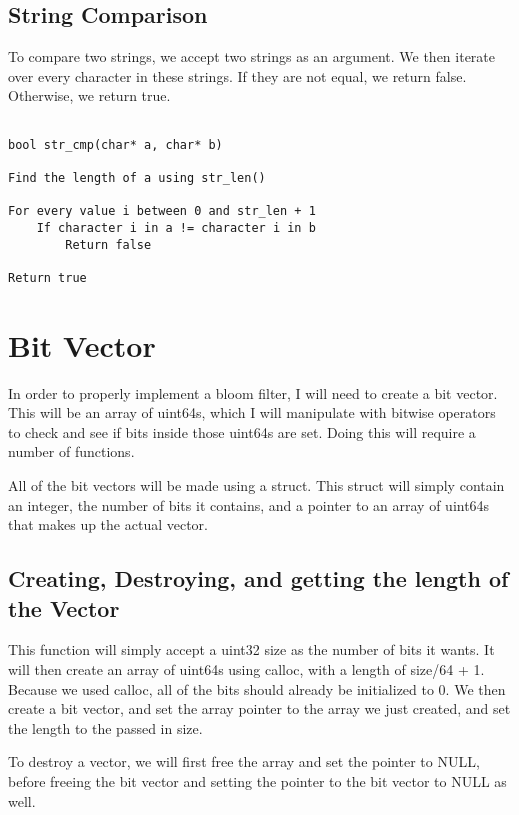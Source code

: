 \documentclass[11pt]{article}
\begin{document}
\subsection{String Comparison}

To compare two strings, we accept two strings as an argument. We then iterate over every character in these strings. If they are not equal, we return false. Otherwise, we return true.

\begin{verbatim}

bool str_cmp(char* a, char* b)

Find the length of a using str_len()

For every value i between 0 and str_len + 1
    If character i in a != character i in b
        Return false

Return true

\end{verbatim}

\section{Bit Vector}

In order to properly implement a bloom filter, I will need to create a bit vector. This will be an array of uint64s, which I will manipulate with bitwise operators to check and see if bits inside those uint64s are set. Doing this will require a number of functions.

All of the bit vectors will be made using a struct. This struct will simply contain an integer, the number of bits it contains, and a pointer to an array of uint64s that makes up the actual vector.

\subsection{Creating, Destroying, and getting the length of the Vector}

This function will simply accept a uint32 size as the number of bits it wants. It will then create an array of uint64s using calloc, with a length of size/64 + 1. Because we used calloc, all of the bits should already be initialized to 0. We then create a bit vector, and set the array pointer to the array we just created, and set the length to the passed in size.

To destroy a vector, we will first free the array and set the pointer to NULL, before freeing the bit vector and setting the pointer to the bit vector to NULL as well.
\end{document}
